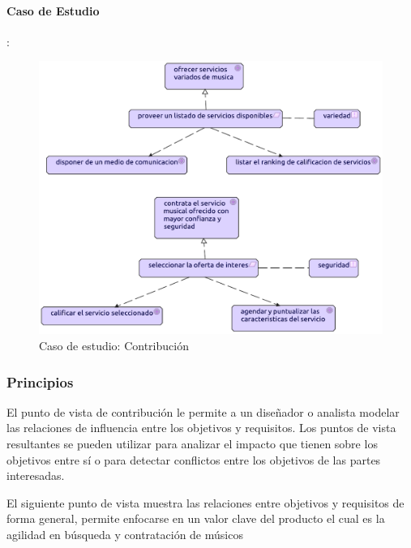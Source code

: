 \paragraph{Caso de Estudio}:
\begin{figure}[h!]
	\centering
	\includegraphics[width=\linewidth]{Desarrollo/ArquitecturaEmpresarial/Motivacion/imgs/Contribucion.pdf}
	\caption{Caso de estudio: Contribución}
\end{figure}

\newpage


\subsubsection{Principios}
El punto de vista de contribución le permite a un diseñador o analista modelar las relaciones de influencia entre los objetivos y requisitos. Los puntos de vista resultantes se pueden utilizar para analizar el impacto que tienen sobre los objetivos entre sí o para detectar conflictos entre los objetivos de las partes interesadas.
  \vspace{\baselineskip}

El siguiente punto de vista muestra las relaciones entre objetivos y requisitos de forma general, permite enfocarse en un valor clave del producto el cual es la agilidad en búsqueda y contratación de músicos

